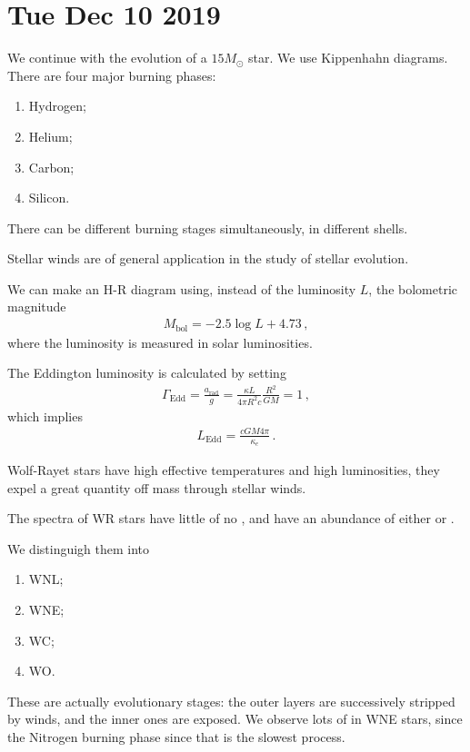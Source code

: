 \documentclass[main.tex]{subfiles}
\begin{document}
\section*{Tue Dec 10 2019}

We continue with the evolution of a \(15 M_{\odot}\) star. 
We use Kippenhahn diagrams. 
There are four major burning phases: 
\begin{enumerate}
    \item Hydrogen;
    \item Helium;
    \item Carbon;
    \item Silicon.
\end{enumerate}

There can be different burning stages simultaneously, in different shells. 

Stellar winds are of general application in the study of stellar evolution. 

We can make an H-R diagram using, instead of the luminosity \(L\), the bolometric magnitude 
%
\begin{align}
  M _{\text{bol}} = -2.5 \log L + 4.73
\,,
\end{align}
%
where the luminosity is measured in solar luminosities. 

The Eddington luminosity is calculated by  setting
%
\begin{align}
  \Gamma_{\text{Edd}} = \frac{a _{\text{rad}}}{g} = \frac{\kappa L}{4 \pi R^2 c} \frac{R^2}{GM} =1
\,,
\end{align}
%
which implies 
%
\begin{align}
  L _{\text{Edd}} = \frac{cGM 4 \pi }{\kappa_e}
\,.
\end{align}

Wolf-Rayet stars have high effective temperatures and high luminosities, they expel a great quantity off mass through stellar winds. 

The spectra of WR stars have little of no , and have an abundance of either  or .

We distinguigh them into 
\begin{enumerate}
    \item WNL;
    \item WNE;
    \item WC;
    \item WO.
\end{enumerate}

These are actually evolutionary stages: the outer layers are successively stripped by winds, and the inner ones are exposed.
We observe lots of  in WNE stars, since the Nitrogen burning phase since that is the slowest process. 
\end{document}
